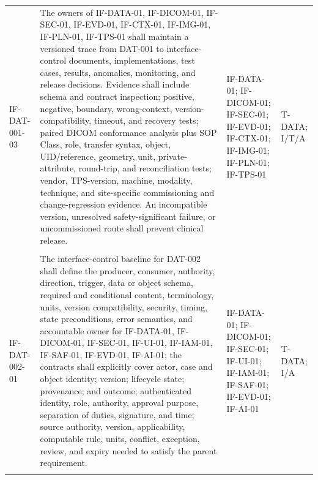\documentclass[11pt,letterpaper]{article}
\begin{document}
\begin{scriptsize}
\begin{longtable}{@{}L{0.14\textwidth}L{0.49\textwidth}L{0.19\textwidth}L{0.10\textwidth}@{}}
\addlinespace[2pt]
\mbox{IF-DAT-001-03} & The owners of IF-DATA-01, IF-DICOM-01, IF-SEC-01, IF-EVD-01, IF-CTX-01, IF-IMG-01, IF-PLN-01, IF-TPS-01 shall maintain a versioned trace from DAT-001 to interface-control documents, implementations, test cases, results, anomalies, monitoring, and release decisions. Evidence shall include schema and contract inspection; positive, negative, boundary, wrong-context, version-compatibility, timeout, and recovery tests; paired DICOM conformance analysis plus SOP Class, role, transfer syntax, object, UID\slash\allowbreak{}reference, geometry, unit, private-attribute, round-trip, and reconciliation tests; vendor, TPS-version, machine, modality, technique, and site-specific commissioning and change-regression evidence. An incompatible version, unresolved safety-significant failure, or uncommissioned route shall prevent clinical release. & IF-DATA-01; IF-DICOM-01; IF-SEC-01; IF-EVD-01; IF-CTX-01; IF-IMG-01; IF-PLN-01; IF-TPS-01 & T-DATA; I\slash\allowbreak{}T\slash\allowbreak{}A \\
\addlinespace[2pt]
 \\
\addlinespace[2pt]
\mbox{IF-DAT-002-01} & The interface-control baseline for DAT-002 shall define the producer, consumer, authority, direction, trigger, data or object schema, required and conditional content, terminology, units, version compatibility, security, timing, state preconditions, error semantics, and accountable owner for IF-DATA-01, IF-DICOM-01, IF-SEC-01, IF-UI-01, IF-IAM-01, IF-SAF-01, IF-EVD-01, IF-AI-01; the contracts shall explicitly cover actor, case and object identity; version; lifecycle state; provenance; and outcome; authenticated identity, role, authority, approval purpose, separation of duties, signature, and time; source authority, version, applicability, computable rule, units, conflict, exception, review, and expiry needed to satisfy the parent requirement. & IF-DATA-01; IF-DICOM-01; IF-SEC-01; IF-UI-01; IF-IAM-01; IF-SAF-01; IF-EVD-01; IF-AI-01 & T-DATA; I\slash\allowbreak{}A \\
\addlinespace[2pt]

\end{longtable}
\end{scriptsize}
\end{document}
